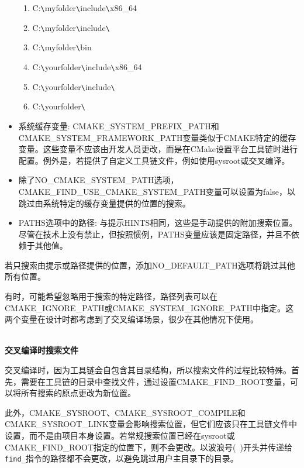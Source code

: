 \begin{itemize}
\begin{enumerate}
\item 
C:\verb|\|myfolder\verb|\|include\verb|\|x86\_64

\item 
C:\verb|\|myfolder\verb|\|include\verb|\|

\item 
C:\verb|\|myfolder\verb|\|bin

\item 
C:\verb|\|yourfolder\verb|\|include\verb|\|x86\_64

\item 
C:\verb|\|yourfolder\verb|\|include\verb|\|

\item 
C:\verb|\|yourfolder\verb|\|
\end{enumerate}

\item 
系统缓存变量: CMAKE\_SYSTEM\_PREFIX\_PATH和CMAKE\_SYSTEM\_FRAMEWORK\_PATH变量类似于CMAKE特定的缓存变量。这些变量不应该由开发人员更改，而是在CMake设置平台工具链时进行配置。例外是，若提供了自定义工具链文件，例如使用sysroot或交叉编译。

\item 
除了NO\_CMAKE\_SYSTEM\_PATH选项，CMAKE\_FIND\_USE\_CMAKE\_SYSTEM\_PATH变量可以设置为false，以跳过由系统特定的缓存变量提供的位置的搜索。

\item 
PATHS选项中的路径: 与提示HINTS相同，这些是手动提供的附加搜索位置。尽管在技术上没有禁止，但按照惯例，PATHS变量应该是固定路径，并且不依赖于其他值。
\end{itemize}

若只搜索由提示或路径提供的位置，添加NO\_DEFAULT\_PATH选项将跳过其他所有位置。

有时，可能希望忽略用于搜索的特定路径，路径列表可以在CMAKE\_IGNORE\_PATH或CMAKE\_SYSTEM\_IGNORE\_PATH中指定。这两个变量在设计时都考虑到了交叉编译场景，很少在其他情况下使用。

\hspace*{\fill} \\ %
\noindent
\textbf{交叉编译时搜索文件}

交叉编译时，因为工具链会自包含其目录结构，所以搜索文件的过程比较特殊。首先，需要在工具链的目录中查找文件，通过设置CMAKE\_FIND\_ROOT变量，可以将所有搜索的原点更改为新位置。

此外，CMAKE\_SYSROOT、CMAKE\_SYSROOT\_COMPILE和CMAKE\_SYSROOT\_LINK变量会影响搜索位置，但它们应该只在工具链文件中设置，而不是由项目本身设置。若常规搜索位置已经在sysroot或CMAKE\_FIND\_ROOT指定的位置下，则不会更改。以波浪号(~)开头并传递给\texttt{find\_}指令的路径都不会更改，以避免跳过用户主目录下的目录。

